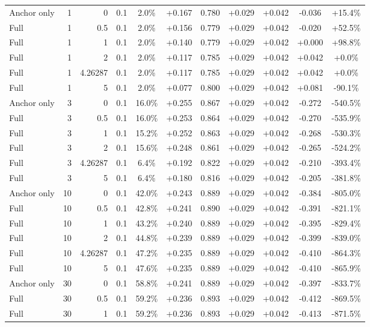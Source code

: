 \begin{table}[htbp]
\begin{tabular}{lrrrccccccc}
Anchor only & 1 & 0 & 0.1 & 2.0\% & +0.167 & 0.780 & +0.029 & +0.042 & -0.036 & +15.4\% \\
Full & 1 & 0.5 & 0.1 & 2.0\% & +0.156 & 0.779 & +0.029 & +0.042 & -0.020 & +52.5\% \\
Full & 1 & 1 & 0.1 & 2.0\% & +0.140 & 0.779 & +0.029 & +0.042 & +0.000 & +98.8\% \\
Full & 1 & 2 & 0.1 & 2.0\% & +0.117 & 0.785 & +0.029 & +0.042 & +0.042 & +0.0\% \\
Full & 1 & 4.26287 & 0.1 & 2.0\% & +0.117 & 0.785 & +0.029 & +0.042 & +0.042 & +0.0\% \\
Full & 1 & 5 & 0.1 & 2.0\% & +0.077 & 0.800 & +0.029 & +0.042 & +0.081 & -90.1\% \\
Anchor only & 3 & 0 & 0.1 & 16.0\% & +0.255 & 0.867 & +0.029 & +0.042 & -0.272 & -540.5\% \\
Full & 3 & 0.5 & 0.1 & 16.0\% & +0.253 & 0.864 & +0.029 & +0.042 & -0.270 & -535.9\% \\
Full & 3 & 1 & 0.1 & 15.2\% & +0.252 & 0.863 & +0.029 & +0.042 & -0.268 & -530.3\% \\
Full & 3 & 2 & 0.1 & 15.6\% & +0.248 & 0.861 & +0.029 & +0.042 & -0.265 & -524.2\% \\
Full & 3 & 4.26287 & 0.1 & 6.4\% & +0.192 & 0.822 & +0.029 & +0.042 & -0.210 & -393.4\% \\
Full & 3 & 5 & 0.1 & 6.4\% & +0.180 & 0.816 & +0.029 & +0.042 & -0.205 & -381.8\% \\
Anchor only & 10 & 0 & 0.1 & 42.0\% & +0.243 & 0.889 & +0.029 & +0.042 & -0.384 & -805.0\% \\
Full & 10 & 0.5 & 0.1 & 42.8\% & +0.241 & 0.890 & +0.029 & +0.042 & -0.391 & -821.1\% \\
Full & 10 & 1 & 0.1 & 43.2\% & +0.240 & 0.889 & +0.029 & +0.042 & -0.395 & -829.4\% \\
Full & 10 & 2 & 0.1 & 44.8\% & +0.239 & 0.889 & +0.029 & +0.042 & -0.399 & -839.0\% \\
Full & 10 & 4.26287 & 0.1 & 47.2\% & +0.235 & 0.889 & +0.029 & +0.042 & -0.410 & -864.3\% \\
Full & 10 & 5 & 0.1 & 47.6\% & +0.235 & 0.889 & +0.029 & +0.042 & -0.410 & -865.9\% \\
Anchor only & 30 & 0 & 0.1 & 58.8\% & +0.241 & 0.889 & +0.029 & +0.042 & -0.397 & -833.7\% \\
Full & 30 & 0.5 & 0.1 & 59.2\% & +0.236 & 0.893 & +0.029 & +0.042 & -0.412 & -869.5\% \\
Full & 30 & 1 & 0.1 & 59.2\% & +0.236 & 0.893 & +0.029 & +0.042 & -0.413 & -871.5\% \\

\end{tabular}
\end{table}
